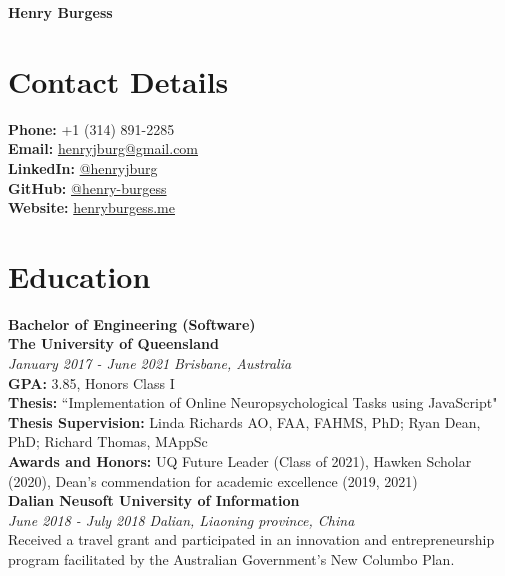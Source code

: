 \documentclass{article}
\begin{document}
  {\Huge\textbf{Henry Burgess}}

  \section*{Contact Details}
  \textbf{Phone:} +1 (314) 891-2285 \\
  \textbf{Email:} \href{mailto:henryjburg@gmail.com}{henryjburg@gmail.com} \\
  \textbf{LinkedIn:} \href{https://www.linkedin.com/in/henryjburg/}{@henryjburg} \\
  \textbf{GitHub:} \href{https://github.com/henry-burgess}{@henry-burgess} \\
  \textbf{Website:} \href{https://henryburgess.me/}{henryburgess.me} \\

  \section*{Education}
  \large\textbf{Bachelor of Engineering (Software)} \\
  \textbf{The University of Queensland} \\
  \textit{January 2017 - June 2021} \hfill \textit{Brisbane, Australia} \\
  \textbf{GPA:} 3.85, Honors Class I \\
  \textbf{Thesis:} ``Implementation of Online Neuropsychological Tasks using JavaScript" \\
  \textbf{Thesis Supervision:} Linda Richards AO, FAA, FAHMS, PhD; Ryan Dean, PhD; Richard Thomas, MAppSc \\
  \textbf{Awards and Honors:} UQ Future Leader (Class of 2021), Hawken Scholar (2020), Dean's commendation for academic excellence (2019, 2021) \\

  \large\textbf{Dalian Neusoft University of Information} \\
  \textit{June 2018 - July 2018} \hfill \textit{Dalian, Liaoning province, China} \\
  Received a travel grant and participated in an innovation and entrepreneurship program facilitated by the Australian Government's New Columbo Plan. \\
  \\

\end{document}
